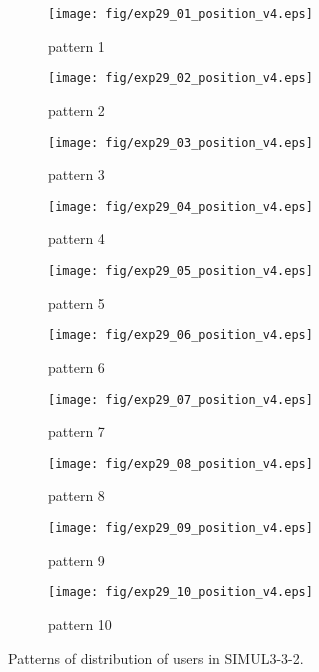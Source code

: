\begin{figure}
	\begin{center}
		\begin{subfigure}[b]{0.32\textwidth}
			\texttt{[image: fig/exp29\_01\_position\_v4.eps]}
			\caption{pattern 1}
			\label{figure:simul3_3_2_a}
		\end{subfigure}
		\begin{subfigure}[b]{0.32\textwidth}
			\texttt{[image: fig/exp29\_02\_position\_v4.eps]}
			\caption{pattern 2}
			\label{figure:simul3_3_2_b}
		\end{subfigure}
		\begin{subfigure}[b]{0.32\textwidth}
			\texttt{[image: fig/exp29\_03\_position\_v4.eps]}
			\caption{pattern 3}
			\label{figure:simul3_3_2_c}
		\end{subfigure}
		\begin{subfigure}[b]{0.32\textwidth}
			\texttt{[image: fig/exp29\_04\_position\_v4.eps]}
			\caption{pattern 4}
			\label{figure:simul3_3_2_d}
		\end{subfigure}
		\begin{subfigure}[b]{0.32\textwidth}
			\texttt{[image: fig/exp29\_05\_position\_v4.eps]}
			\caption{pattern 5}
			\label{figure:simul3_3_2_e}
		\end{subfigure}
		\begin{subfigure}[b]{0.32\textwidth}
			\texttt{[image: fig/exp29\_06\_position\_v4.eps]}
			\caption{pattern 6}
			\label{figure:simul3_3_2_f}
		\end{subfigure}
		\begin{subfigure}[b]{0.32\textwidth}
			\texttt{[image: fig/exp29\_07\_position\_v4.eps]}
			\caption{pattern 7}
			\label{figure:simul3_3_2_g}
		\end{subfigure}
		\begin{subfigure}[b]{0.32\textwidth}
			\texttt{[image: fig/exp29\_08\_position\_v4.eps]}
			\caption{pattern 8}
			\label{figure:simul3_3_2_h}
		\end{subfigure}
		\begin{subfigure}[b]{0.32\textwidth}
			\texttt{[image: fig/exp29\_09\_position\_v4.eps]}
			\caption{pattern 9}
			\label{figure:simul3_3_2_i}
		\end{subfigure}
		\begin{subfigure}[b]{0.32\textwidth}
			\texttt{[image: fig/exp29\_10\_position\_v4.eps]}
			\caption{pattern 10}
			\label{figure:simul3_3_2_j}
		\end{subfigure}
		\caption{Patterns of distribution of users in SIMUL3-3-2.}
		\label{figure:simul3_3_2_p}
	\end{center}
\end{figure}

